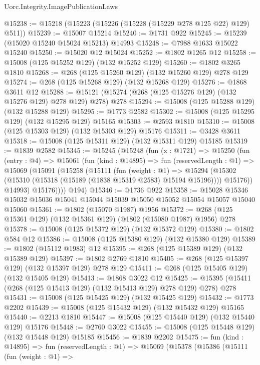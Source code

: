 \begin{lexlean}{Uorc.Integrity.ImagePublicationLaws}
\begin{coremodule}
@15238 := @15218 (@15223 (@15226 (@15228 (@15229 @278 @125 @22) @129) @511))
@15239 := @15007 @15214
@15240 := @1731 @922
@15245 := @15239 (@15020 @15240 @15024 @15213) @14993
@15248 := @7988 @1633 @15022 @15240
@15250 := @15020 @12 @15024
@15252 := @1802 @1265 @12
@15258 := @15008 (@125 @15252 @129) (@132 @15252 @129)
@15260 := @1802 @3265 @1810
@15268 := @268 (@125 @15260 @129) (@132 @15260 @129) @278 @129
@15274 := @268 (@125 @15268 @129) (@132 @15268 @129)
@15276 := @1868 @3611 @12
@15288 := @15121 (@15274 (@268 (@125 @15276 @129) (@132 @15276 @129) @278 @129) @278) @278
@15294 := @15008 (@125 @15288 @129) (@132 @15288 @129)
@15295 := @1773 @2582
@15302 := @15008 (@125 @15295 @129) (@132 @15295 @129) @15165
@15303 := @2593 @1810
@15310 := @15008 (@125 @15303 @129) (@132 @15303 @129) @15176
@15311 := @3428 @3611
@15318 := @15008 (@125 @15311 @129) (@132 @15311 @129) @15185
@15319 := @1839 @2582
@15345 := @15245
    (@15248
      (fun (x : @1721) =>
      @15250
        (fun (entry : @4) =>
        @15061
          (fun (kind : @14895) =>
          fun (reservedLength : @1) =>
          @15069
            (@15091
              (@15258
                (@15111
                  (fun (weight : @1) =>
                  @15294
                    (@15302 (@15310 (@15318 (@15189 (@1838 @15319 @2583) @15194 @15196))))
                    @15176))
                @14993)
              @15176))))
      @194)
@15346 := @1736 @922
@15358 := @15028 @15346 @15032 @15036 @15041 @15044 @15039 @15050 @15052 @15054 @15057 @15040 @15060
@15361 := @1802 (@15070 @1987) @1956
@15372 := @268 (@125 @15361 @129) (@132 @15361 @129) (@1802 (@15080 @1987) @1956) @278
@15378 := @15008 (@125 @15372 @129) (@132 @15372 @129)
@15380 := @1802 @584 @12
@15386 := @15008 (@125 @15380 @129) (@132 @15380 @129)
@15389 := @1802 (@15112 @1983) @12
@15395 := @268 (@125 @15389 @129) (@132 @15389 @129)
@15397 := @1802 @2769 @1810
@15405 := @268 (@125 @15397 @129) (@132 @15397 @129) @278 @129
@15411 := @268 (@125 @15405 @129) (@132 @15405 @129)
@15413 := @1868 @3022 @12
@15425 := @15395 (@15411 (@268 (@125 @15413 @129) (@132 @15413 @129) @278 @129) @278) @278
@15431 := @15008 (@125 @15425 @129) (@132 @15425 @129)
@15432 := @1773 @2202
@15439 := @15008 (@125 @15432 @129) (@132 @15432 @129) @15165
@15440 := @2213 @1810
@15447 := @15008 (@125 @15440 @129) (@132 @15440 @129) @15176
@15448 := @2760 @3022
@15455 := @15008 (@125 @15448 @129) (@132 @15448 @129) @15185
@15456 := @1839 @2202
@15475 := fun (kind : @14895) =>
  fun (reservedLength : @1) =>
  @15069
    (@15378
      (@15386
        (@15111
          (fun (weight : @1) =>

\end{coremodule}
\end{lexlean}
